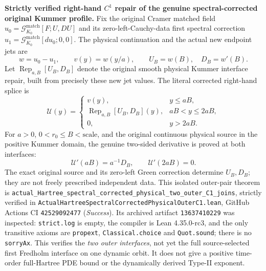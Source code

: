 \documentclass[11pt]{amsart}
\begin{document}
\medskip
\noindent\textbf{Strictly verified right-hand $C^1$ repair of the
genuine spectral-corrected original Kummer profile.}
Fix the original Cramer matched field
\(u_0=\mathcal G^{\mathrm{match}}_{K_0}[F;U,DU]\) and its
zero-left-Cauchy-data first spectral correction
\(u_1=\mathcal G^{\mathrm{match}}_{K_0}[d u_0;0,0]\).
The physical continuation and the actual new endpoint jets are
\[
  w=u_0-u_1,\qquad
  v(y)=w(y/a),\qquad
  U_B=w(B),\quad D_B=w'(B).
\]
Let \(\operatorname{Rep}_{a,B}[U_B,D_B]\) denote the original smooth
physical Kummer interface repair, built from precisely these new
jet values. The literal corrected right-hand splice is
\[
 \mathcal U(y)=
 \begin{cases}
     v(y),&y\le aB,\\
     \operatorname{Rep}_{a,B}[U_B,D_B](y),
       &aB<y\le 2aB,\\
     0,&y>2aB.
 \end{cases}
\]
For \(a>0\), \(0<r_0\le B<\mathrm{scale}\), and the original
continuous physical source in the positive Kummer domain,
the genuine two-sided derivative is proved at both interfaces:
\[
  \boxed{
    \mathcal U'(aB)=a^{-1}D_B,\qquad
    \mathcal U'(2aB)=0.}
\]
The exact original source and its zero-left Green correction determine
\(U_B,D_B\); they are not freely prescribed independent data.
This isolated outer-pair theorem is
\texttt{actual\_Hartree\_spectral\_corrected\_physical\_two\_outer\_C1\_joins},
strictly verified in
\texttt{ActualHartreeSpectralCorrectedPhysicalOuterC1.lean},
GitHub Actions CI \texttt{42529092477} (\emph{Success}).
Its archived artifact \texttt{13637410229} was inspected:
\texttt{strict.log} is empty, the compiler is Lean 4.35.0-rc3,
and the only transitive axioms are \texttt{propext},
\texttt{Classical.choice} and \texttt{Quot.sound}; there is no
\texttt{sorryAx}.
This verifies the \emph{two outer interfaces}, not yet the full
source-selected first Fredholm interface on one dynamic orbit.
It does not give a positive time-order full-Hartree PDE bound or
the dynamically derived Type-II exponent.
\end{document}
